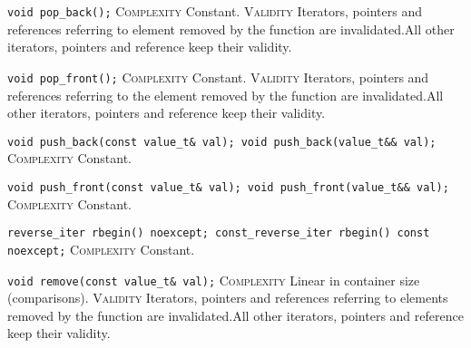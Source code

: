 \noindent{}\hspace*{0.25em}\lstinline[basicstyle=\ttfamily\color{cgreen}]{void pop_back();} \textsc{Complexity} Constant. \textsc{Validity} Iterators, pointers and references referring to element removed by the function are invalidated.All other iterators, pointers and reference keep their validity.\\\vspace{-0.6em}

\noindent{}\hspace*{0.25em}\lstinline[basicstyle=\ttfamily\color{cgreen}]{void pop_front();} \textsc{Complexity} Constant. \textsc{Validity} Iterators, pointers and references referring to the element removed by the function are invalidated.All other iterators, pointers and reference keep their validity.\\\vspace{-0.6em}

\noindent{}\hspace*{0.25em}\lstinline[basicstyle=\ttfamily\color{cgreen}]{void push_back(const value_t& val); void push_back(value_t&& val);} \textsc{Complexity} Constant.\\\vspace{-0.6em}

\noindent{}\hspace*{0.25em}\lstinline[basicstyle=\ttfamily\color{cgreen}]{void push_front(const value_t& val); void push_front(value_t&& val);} \textsc{Complexity} Constant.\\\vspace{-0.6em}

\noindent{}\hspace*{0.25em}\lstinline[basicstyle=\ttfamily\color{cgreen}]{reverse_iter rbegin() noexcept; const_reverse_iter rbegin() const noexcept;} \textsc{Complexity} Constant.\\\vspace{-0.6em}

\noindent{}\hspace*{0.25em}\lstinline[basicstyle=\ttfamily\color{corange}]{void remove(const value_t& val);} \textsc{Complexity} Linear in container size (comparisons). \textsc{Validity} Iterators, pointers and references referring to elements removed by the function are invalidated.All other iterators, pointers and reference keep their validity.\\\vspace{-0.6em}

